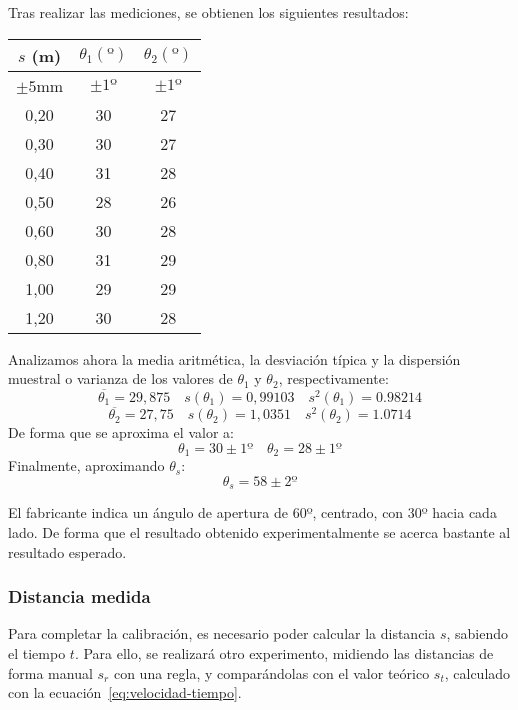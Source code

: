 \documentclass[10pt,a4paper,hidelinks,twocolumn]{article}
\begin{document}
Tras realizar las mediciones, se obtienen los siguientes resultados:
\begin{center}
\begin{tabular}{ | c | c | c | }
\hline
$s$ (m) & $\theta_1(º)$ & $\theta_2(º)$ \\ \hline
$\pm5$mm & $\pm1º$ & $\pm1º$ \\ \hline \hline
0,20 & 30 & 27 \\ \hline
0,30 & 30 & 27 \\ \hline
0,40 & 31 & 28 \\ \hline
0,50 & 28 & 26 \\ \hline
0,60 & 30 & 28 \\ \hline
0,80 & 31 & 29 \\ \hline
1,00 & 29 & 29 \\ \hline
1,20 & 30 & 28 \\ \hline
\end{tabular}
\end{center}

Analizamos ahora la media aritmética, la desviación típica y la dispersión 
muestral o varianza de los valores de $\theta_1$ y $\theta_2$, respectivamente:
$$ \overline{\theta_1} = 29,875 \quad s(\theta_1) = 0,99103 \quad s^2(\theta_1) 
= 0.98214 $$
$$ \overline{\theta_2} = 27,75 \quad s(\theta_2) = 1,0351 \quad s^2(\theta_2) = 
1.0714 $$
De forma que se aproxima el valor a:
$$ \theta_1 = 30 \pm 1º \quad \theta_2 = 28 \pm 1º $$
Finalmente, aproximando $\theta_s$:
$$\theta_s = 58 \pm 2º$$

El fabricante indica un ángulo de apertura de 60º, centrado, con 30º hacia cada 
lado. De forma que el resultado obtenido experimentalmente se acerca bastante al 
resultado esperado.

%
\subsubsection{Distancia medida}

Para completar la calibración, es necesario poder calcular la distancia $s$,
sabiendo el tiempo $t$. Para ello, se realizará otro experimento, midiendo las
distancias de forma manual $s_r$ con una regla, y comparándolas con el valor
teórico $s_t$, calculado con la ecuación~\ref{eq:velocidad-tiempo}.
\end{document}

